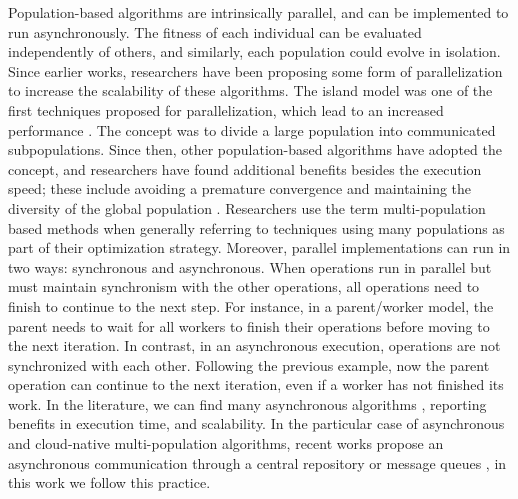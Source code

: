 \documentclass[review]{elsarticle}
\begin{document}
Population-based algorithms are intrinsically parallel, and can be implemented to run asynchronously.
The fitness of each individual can be evaluated independently of 
others, and similarly, each population could evolve in isolation. Since 
earlier works, researchers have been proposing some form of parallelization
\cite{muhlenbein1988evolution} to increase the scalability of these algorithms.
The island model was one of the first techniques proposed for parallelization,
which lead to an increased performance \cite{gorges1990explicit,grosso1985computer}. 
The concept was to divide a large population into communicated subpopulations. 
Since then, other population-based algorithms have adopted the concept, 
and researchers have found additional benefits
besides the execution speed; these include avoiding a premature convergence and
maintaining the diversity of the global population \cite{li2015multi}. Researchers use the term
multi-population based methods when generally referring to techniques using
many populations as part of their optimization strategy. %
Moreover, parallel implementations can run in two ways: synchronous and
asynchronous. When operations run in parallel but must maintain synchronism with
the other operations,  all operations need to finish to continue to the next
step. For instance, in a  parent/worker model, the parent needs to wait for all
workers to finish their operations before moving to the next iteration.  In
contrast, in an asynchronous execution,  operations are not synchronized with
each other. Following the previous example, now the parent operation can
continue to the next iteration, even if a worker has not finished its work.  In
the literature, we can find many asynchronous algorithms
\cite{coleman89,baugh2003asynchronous}, reporting benefits in execution time,
and scalability. In the particular case of asynchronous and cloud-native
multi-population algorithms, recent works propose an asynchronous communication
through a central repository \cite{sofea:cec2012, JSON} or message queues
\cite{salza2019speed, guervos2018introducing}, in this work we follow this
practice.
\end{document}

